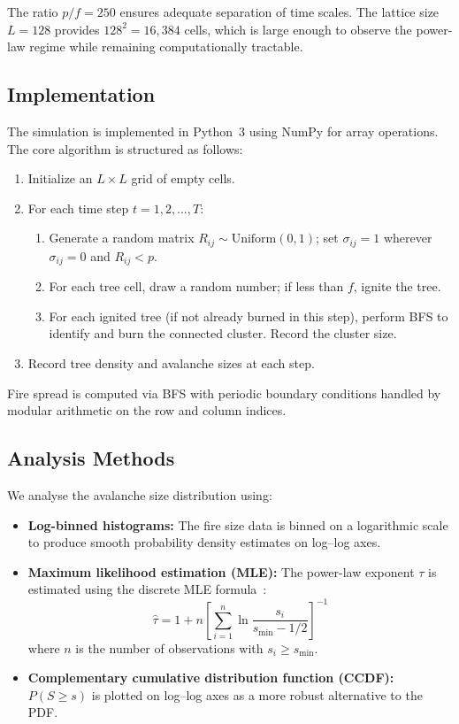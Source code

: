 \documentclass[12pt, a4paper, twocolumn]{article}
\begin{document}
The ratio $p/f = 250$ ensures adequate separation of time scales.
The lattice size $L = 128$ provides $128^2 = 16{,}384$ cells, which is large enough to observe the power-law regime while remaining computationally tractable.

\subsection{Implementation}

The simulation is implemented in Python~3 using NumPy for array operations.
The core algorithm is structured as follows:

\begin{enumerate}[leftmargin=*]
    \item Initialize an $L \times L$ grid of empty cells.
    \item For each time step $t = 1, 2, \ldots, T$:
    \begin{enumerate}
        \item Generate a random matrix $R_{ij} \sim \text{Uniform}(0,1)$; set $\sigma_{ij} = 1$ wherever $\sigma_{ij} = 0$ and $R_{ij} < p$.
        \item For each tree cell, draw a random number; if less than $f$, ignite the tree.
        \item For each ignited tree (if not already burned in this step), perform BFS to identify and burn the connected cluster. Record the cluster size.
    \end{enumerate}
    \item Record tree density and avalanche sizes at each step.
\end{enumerate}

Fire spread is computed via BFS with periodic boundary conditions handled by modular arithmetic on the row and column indices.

\subsection{Analysis Methods}

We analyse the avalanche size distribution using:
\begin{itemize}[leftmargin=*]
    \item \textbf{Log-binned histograms:} The fire size data is binned on a logarithmic scale to produce smooth probability density estimates on log--log axes.
    \item \textbf{Maximum likelihood estimation (MLE):} The power-law exponent $\tau$ is estimated using the discrete MLE formula~\citep{clauset2009}:
    \begin{equation}
        \hat{\tau} = 1 + n \left[\sum_{i=1}^{n} \ln \frac{s_i}{s_{\min} - 1/2}\right]^{-1}
        \label{eq:mle}
    \end{equation}
    where $n$ is the number of observations with $s_i \geq s_{\min}$.
    \item \textbf{Complementary cumulative distribution function (CCDF):} $P(S \geq s)$ is plotted on log--log axes as a more robust alternative to the PDF.
\end{itemize}
\end{document}

